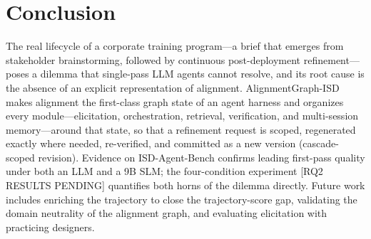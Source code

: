 \section{Conclusion}
\label{sec:conclusion}

The real lifecycle of a corporate training program---a brief that emerges from stakeholder brainstorming, followed by continuous post-deployment refinement---poses a dilemma that single-pass LLM agents cannot resolve, and its root cause is the absence of an explicit representation of alignment. AlignmentGraph-ISD makes alignment the first-class graph state of an agent harness and organizes every module---elicitation, orchestration, retrieval, verification, and multi-session memory---around that state, so that a refinement request is scoped, regenerated exactly where needed, re-verified, and committed as a new version (cascade-scoped revision). Evidence on ISD-Agent-Bench confirms leading first-pass quality under both an LLM and a 9B SLM; the four-condition experiment [RQ2 RESULTS PENDING] quantifies both horns of the dilemma directly. Future work includes enriching the trajectory to close the trajectory-score gap, validating the domain neutrality of the alignment graph, and evaluating elicitation with practicing designers.
